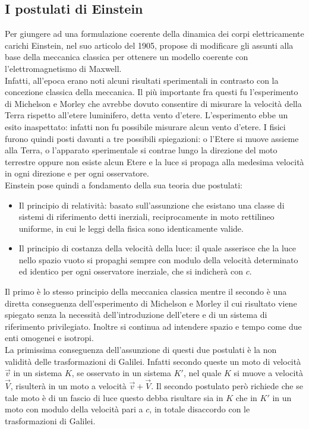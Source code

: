 \subsection{I postulati di Einstein}\label{Sec:postulati}
Per giungere ad una formulazione coerente della dinamica dei corpi elettricamente carichi Einstein, nel suo articolo \cite{Einstein1905} del 1905, propose di modificare gli assunti alla base della meccanica classica per ottenere un modello coerente con l'elettromagnetismo di Maxwell.\\Infatti, all'epoca erano noti alcuni risultati sperimentali in contrasto con la concezione classica della meccanica. Il più importante fra questi fu l'esperimento di Michelson e Morley che avrebbe dovuto consentire di misurare la velocità della Terra rispetto all'etere luminifero, detta vento d'etere. L'esperimento ebbe un esito inaspettato: infatti non fu possibile misurare alcun vento d'etere. I fisici furono quindi posti davanti a tre possibili spiegazioni: o l'Etere si muove assieme alla Terra, o l'apparato sperimentale si contrae lungo la direzione del moto terrestre oppure non esiste alcun Etere e la luce si propaga alla medesima velocità in ogni direzione e per ogni osservatore.\\
Einstein pose quindi a fondamento della sua teoria due postulati:
\begin{itemize}
    \item Il principio di relatività: basato sull'assunzione che esistano  una classe di sistemi di riferimento detti inerziali, reciprocamente in moto rettilineo uniforme, in cui le leggi della fisica sono identicamente valide.
    \item Il principio di costanza della velocità della luce: il quale asserisce che la luce nello spazio vuoto si propaghi sempre con modulo della velocità determinato ed identico per ogni osservatore inerziale, che si indicherà con $c$. 
\end{itemize}
Il primo è lo stesso principio della meccanica classica mentre il secondo è una diretta conseguenza dell'esperimento di Michelson e Morley il cui risultato viene spiegato senza la necessità dell'introduzione dell'etere e di un sistema di riferimento privilegiato. Inoltre si continua ad intendere spazio e tempo come due enti omogenei e isotropi.\\

La primissima conseguenza dell'assunzione di questi due postulati è la non validità delle trasformazioni di Galilei. Infatti secondo queste un moto di velocità $\vec{v}$ in un sistema $K$, se osservato in un sistema $K'$, nel quale $K$ si muove a velocità $\vec{V}$, risulterà in un moto a velocità $\vec{v}+\vec{V}$. Il secondo postulato però richiede che se tale moto è di un fascio di luce questo debba risultare sia in $K$ che in $K'$ in un moto con modulo della velocità pari a $c$, in totale disaccordo con le trasformazioni di Galilei.\\

